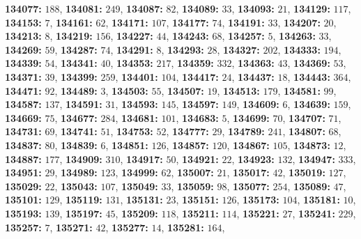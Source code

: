 \textsf{\bfseries 134077:} $188$, \textsf{\bfseries 134081:} $249$, \textsf{\bfseries 134087:} $82$, \textsf{\bfseries 134089:} $33$, \textsf{\bfseries 134093:} $21$, \textsf{\bfseries 134129:} $117$, \textsf{\bfseries 134153:} $7$, \textsf{\bfseries 134161:} $62$, \textsf{\bfseries 134171:} $107$, \textsf{\bfseries 134177:} $74$, \textsf{\bfseries 134191:} $33$, \textsf{\bfseries 134207:} $20$, \textsf{\bfseries 134213:} $8$, \textsf{\bfseries 134219:} $156$, \textsf{\bfseries 134227:} $44$, \textsf{\bfseries 134243:} $68$, \textsf{\bfseries 134257:} $5$, \textsf{\bfseries 134263:} $33$, \textsf{\bfseries 134269:} $59$, \textsf{\bfseries 134287:} $74$, \textsf{\bfseries 134291:} $8$, \textsf{\bfseries 134293:} $28$, \textsf{\bfseries 134327:} $202$, \textsf{\bfseries 134333:} $194$, \textsf{\bfseries 134339:} $54$, \textsf{\bfseries 134341:} $40$, \textsf{\bfseries 134353:} $217$, \textsf{\bfseries 134359:} $332$, \textsf{\bfseries 134363:} $43$, \textsf{\bfseries 134369:} $53$, \textsf{\bfseries 134371:} $39$, \textsf{\bfseries 134399:} $259$, \textsf{\bfseries 134401:} $104$, \textsf{\bfseries 134417:} $24$, \textsf{\bfseries 134437:} $18$, \textsf{\bfseries 134443:} $364$, \textsf{\bfseries 134471:} $92$, \textsf{\bfseries 134489:} $3$, \textsf{\bfseries 134503:} $55$, \textsf{\bfseries 134507:} $19$, \textsf{\bfseries 134513:} $179$, \textsf{\bfseries 134581:} $99$, \textsf{\bfseries 134587:} $137$, \textsf{\bfseries 134591:} $31$, \textsf{\bfseries 134593:} $145$, \textsf{\bfseries 134597:} $149$, \textsf{\bfseries 134609:} $6$, \textsf{\bfseries 134639:} $159$, \textsf{\bfseries 134669:} $75$, \textsf{\bfseries 134677:} $284$, \textsf{\bfseries 134681:} $101$, \textsf{\bfseries 134683:} $5$, \textsf{\bfseries 134699:} $70$, \textsf{\bfseries 134707:} $71$, \textsf{\bfseries 134731:} $69$, \textsf{\bfseries 134741:} $51$, \textsf{\bfseries 134753:} $52$, \textsf{\bfseries 134777:} $29$, \textsf{\bfseries 134789:} $241$, \textsf{\bfseries 134807:} $68$, \textsf{\bfseries 134837:} $80$, \textsf{\bfseries 134839:} $6$, \textsf{\bfseries 134851:} $126$, \textsf{\bfseries 134857:} $120$, \textsf{\bfseries 134867:} $105$, \textsf{\bfseries 134873:} $12$, \textsf{\bfseries 134887:} $177$, \textsf{\bfseries 134909:} $310$, \textsf{\bfseries 134917:} $50$, \textsf{\bfseries 134921:} $22$, \textsf{\bfseries 134923:} $132$, \textsf{\bfseries 134947:} $333$, \textsf{\bfseries 134951:} $29$, \textsf{\bfseries 134989:} $123$, \textsf{\bfseries 134999:} $62$, \textsf{\bfseries 135007:} $21$, \textsf{\bfseries 135017:} $42$, \textsf{\bfseries 135019:} $127$, \textsf{\bfseries 135029:} $22$, \textsf{\bfseries 135043:} $107$, \textsf{\bfseries 135049:} $33$, \textsf{\bfseries 135059:} $98$, \textsf{\bfseries 135077:} $254$, \textsf{\bfseries 135089:} $47$, \textsf{\bfseries 135101:} $129$, \textsf{\bfseries 135119:} $131$, \textsf{\bfseries 135131:} $23$, \textsf{\bfseries 135151:} $126$, \textsf{\bfseries 135173:} $104$, \textsf{\bfseries 135181:} $10$, \textsf{\bfseries 135193:} $139$, \textsf{\bfseries 135197:} $45$, \textsf{\bfseries 135209:} $118$, \textsf{\bfseries 135211:} $114$, \textsf{\bfseries 135221:} $27$, \textsf{\bfseries 135241:} $229$, \textsf{\bfseries 135257:} $7$, \textsf{\bfseries 135271:} $42$, \textsf{\bfseries 135277:} $14$, \textsf{\bfseries 135281:} $164$, 
